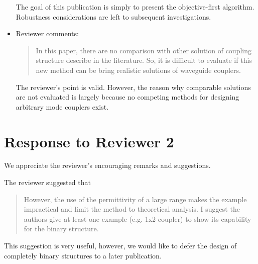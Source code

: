 \documentclass{article}
\newcommand{\Q}[1]{\begin{quote} #1 \end{quote}}
\begin{document}
\begin{itemize}
    The goal of this publication is simply to present the objective-first
    algorithm. 
    Robustness considerations are left to subsequent investigations.

\item Reviewer comments:
    \Q{In this paper, there are no comparison with other solution of coupling structure
describe in the literature. So, it is difficult to evaluate if this new method can be bring
realistic solutions of waveguide couplers.}

    The reviewer's point is valid.
    However, the reason why comparable solutions are not evaluated is largely
    because no competing methods for designing arbitrary mode couplers exist.
\end{itemize}

\section*{Response to Reviewer 2}
We appreciate the reviewer's encouraging remarks and suggestions.

The reviewer suggested that
\Q{ However, the use of the permittivity of a large range makes the example impractical and limit the method to theoretical analysis. I suggest the authors give at least one example (e.g. 1x2 coupler) to show its capability for the binary structure. }

This suggestion is very useful, however, we would like to defer the design of
    completely binary structures to a later publication.
\end{document}
